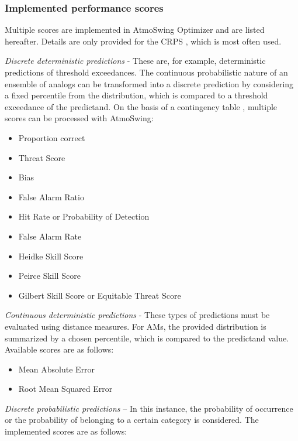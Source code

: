 \documentclass[gmdd]{copernicus}
\begin{document}
\subsubsection{Implemented performance scores}
\label{sec:scores}

Multiple scores are implemented in AtmoSwing Optimizer and are listed hereafter. Details are only provided for the CRPS \citep[Continuous Ranked Probability Score,][]{Brown1974, Matheson1976, Hersbach2000}, which is most often used. 


\textit{Discrete deterministic predictions} - These are, for example, deterministic predictions of threshold exceedances. The continuous probabilistic nature of an ensemble of analogs can be transformed into a discrete prediction by considering a fixed percentile from the distribution, which is compared to a threshold exceedance of the predictand. On the basis of a contingency table \citep{Wilks2006}, multiple scores can be processed with AtmoSwing:

\begin{itemize}
	\item Proportion correct \citep{Finley1884}
	\item Threat Score \citep{Gilbert1884}
	\item Bias
	\item False Alarm Ratio
	\item Hit Rate or Probability of Detection
	\item False Alarm Rate
	\item Heidke Skill Score \citep{Heidke1926}
	\item Peirce Skill Score \citep{Peirce1884}
	\item Gilbert Skill Score or Equitable Threat Score \citep{Gilbert1884}
\end{itemize}


\textit{Continuous deterministic predictions} - These types of predictions must be evaluated using distance measures. For AMs, the provided distribution is summarized by a chosen percentile, which is compared to the predictand value. Available scores are as follows:

\begin{itemize}
	\item Mean Absolute Error
	\item Root Mean Squared Error
\end{itemize}


\textit{Discrete probabilistic predictions} – In this instance, the probability of occurrence or the probability of belonging to a certain category is considered. The implemented scores are as follows:
\end{document}
